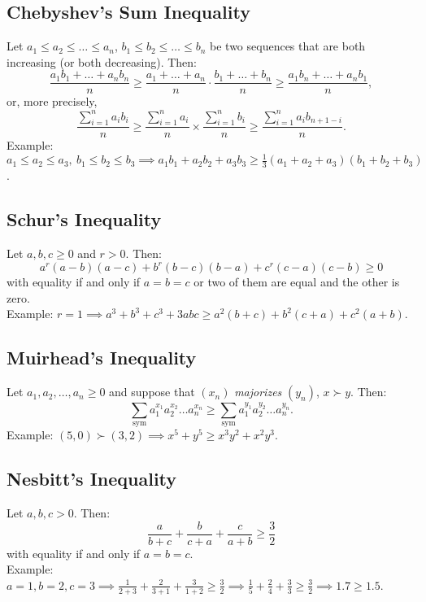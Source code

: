 \documentclass[a4paper,11pt]{article}
\begin{document}
\subsection{Chebyshev's Sum Inequality}
\begin{tcolorbox}
    Let $a_1 \leq a_2 \leq \dots \leq a_n$, $b_1 \leq b_2 \leq \dots \leq b_n$ be two sequences that are both increasing (or both decreasing). Then:
    \[
    \frac{a_1b_1 + \dots + a_nb_n}{n} \geq \frac{a_1 + \dots + a_n}{n} \cdot \frac{b_1 + \dots + b_n}{n} \geq \frac{a_1b_n + \dots + a_nb_1}{n},
    \]
    or, more precisely,
    \[
    \frac{\sum_{i=1}^n a_ib_i}{n} \geq \frac{\sum_{i=1}^n a_i}{n} \times \frac{\sum_{i=1}^n b_i}{n} \geq \frac{\sum_{i=1}^n a_ib_{n+1-i}}{n}.
    \]
    Example: $a_1 \leq a_2 \leq a_3,\ b_1 \leq b_2 \leq b_3 \implies \textstyle a_1b_1 + a_2b_2 + a_3b_3 \geq \frac{1}{3} (a_1+a_2+a_3)(b_1+b_2+b_3)$.
\end{tcolorbox}


\subsection{Schur's Inequality}
\begin{tcolorbox}
    Let $a,b,c \geq 0$ and $r>0$. Then:
    \[
    a^r(a-b)(a-c) + b^r(b-c)(b-a) + c^r(c-a)(c-b) \geq 0
    \]
    with equality if and only if $a=b=c$ or two of them are equal and the other is zero. \\[6pt]
    Example: $\textstyle r=1 \implies a^3+b^3+c^3+3abc\geq a^2(b+c) + b^2(c+a) + c^2(a+b)$.
\end{tcolorbox}


\subsection{Muirhead's Inequality}
\begin{tcolorbox}
    Let $a_1,a_2,\dots,a_n\geq0$ and suppose that $(x_n)$ \emph{majorizes} $(y_n)$, $x\succ y$. Then:
    \[
    \sum_{\text{sym}} a_1^{x_1}a_2^{x_2}\dots a_n^{x_n} \geq \sum_{\text{sym}} a_1^{y_1}a_2^{y_2}\dots a_n^{y_n}.
    \]
    Example: $\textstyle (5,0) \succ (3,2) \implies x^5+y^5 \geq x^3y^2+x^2y^3$.
\end{tcolorbox}


\subsection{Nesbitt's Inequality}
\begin{tcolorbox}
    Let $a,b,c>0$. Then:
    \[
    \frac{a}{b+c} + \frac{b}{c+a} + \frac{c}{a+b} \geq \frac{3}{2}
    \]
    with equality if and only if $a=b=c$. \\[6pt]
    Example: $\textstyle a=1,b=2,c=3 \implies \frac{1}{2+3} + \frac{2}{3+1} + \frac{3}{1+2} \geq \frac{3}{2} \implies \frac{1}{5} + \frac{2}{4} + \frac{3}{3} \geq \frac{3}{2} \implies1.7 \geq 1.5$.
\end{tcolorbox}
\end{document}
